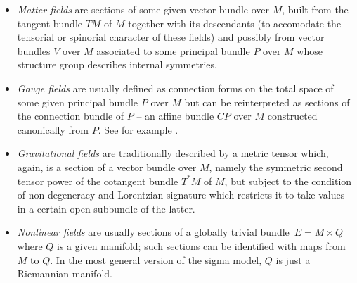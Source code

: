 \documentclass[a4paper,12pt,fleqn]{article}  %
\begin{document}
\begin{itemize}
 \item \emph{Matter fields} are sections of some given vector bundle over $M$,
       built from the tangent bundle $TM$ of $M$ together with its descendants
       (to accomodate the tensorial or spinorial character of these fields)
       and possibly from vector bundles $V$ over $M$ associated to some
       principal bundle $P$ over $M$ whose structure group describes
       internal symmetries.
 \item \emph{Gauge fields} are usually defined as connection forms on the
       total space of some given principal bundle $P$ over $M$ but can be
       reinterpreted as sections of the connection bundle of $P$ -- an
       affine bundle $CP$ over $M$ constructed canonically from $P$.
       See for example \cite{NODG}.
 \item \emph{Gravitational fields} are traditionally described by a metric
       tensor which, again, is a section of a vector bundle over $M$, namely
       the symmetric second tensor power of the cotangent bundle $T^* M$ of
       $M$, but subject to the condition of non-degeneracy and Lorentzian
       signature which restricts it to take values in a certain open
       subbundle of the latter.
 \item \emph{Nonlinear fields} are usually sections of a globally trivial
       bundle $\, E = M \times Q \,$ where $Q$ is a given manifold; such
       sections can be identified with maps from $M$ to $Q$. In the most
       general version of the sigma model, $Q$ is just a Riemannian manifold.
\end{itemize}


\nocite{*}


\end{document}
